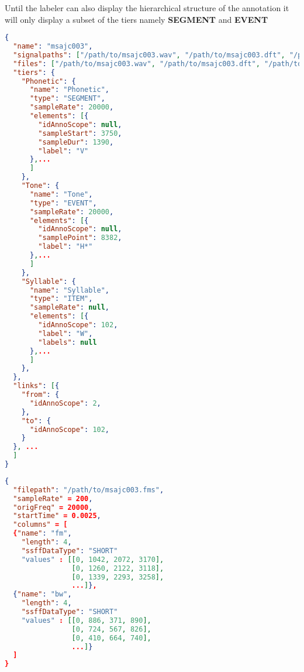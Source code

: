 \documentclass[A4,12pt, utf8]{article}
\begin{document}
Until the labeler can also display the hierarchical structure of the annotation it will only 
display a subset of the tiers namely \textbf{SEGMENT} and \textbf{EVENT}

\begin{lstlisting}[caption=New annotation file example, label=ilr, language=json,firstnumber=1]
{
  "name": "msajc003",
  "signalpaths": ["/path/to/msajc003.wav", "/path/to/msajc003.dft", "/path/2/msajc003.fms"],
  "files": ["/path/to/msajc003.wav", "/path/to/msajc003.dft", "/path/to/msajc003.fms"],
  "tiers": {
    "Phonetic": {
      "name": "Phonetic",
      "type": "SEGMENT",
      "sampleRate": 20000,
      "elements": [{
        "idAnnoScope": null,
        "sampleStart": 3750,
        "sampleDur": 1390,
        "label": "V"
      },...
      ]
    },
    "Tone": {
      "name": "Tone",
      "type": "EVENT",
      "sampleRate": 20000,
      "elements": [{
        "idAnnoScope": null,
        "samplePoint": 8382,
        "label": "H*"
      },...
      ]
    },
    "Syllable": {
      "name": "Syllable",
      "type": "ITEM",
      "sampleRate": null,
      "elements": [{
        "idAnnoScope": 102,
        "label": "W",
        "labels": null
      },...
      ]
    },
  },
  "links": [{
    "from": {
      "idAnnoScope": 2,
    },
    "to": {
      "idAnnoScope": 102,
    }
  }, ...
  ]
}
\end{lstlisting}

\begin{lstlisting}[caption=EMU-webApp internal derived signal representation, label=idsr, language=json,firstnumber=1]
{
  "filepath": "/path/to/msajc003.fms",
  "sampleRate" = 200,
  "origFreq" = 20000,
  "startTime" = 0.0025,
  "columns" = [
  {"name": "fm",
    "length": 4,
    "ssffDataType": "SHORT"
    "values" : [[0, 1042, 2072, 3170],
                [0, 1260, 2122, 3118],
                [0, 1339, 2293, 3258],
                ...]},
  {"name": "bw",
    "length": 4,
    "ssffDataType": "SHORT"
    "values" : [[0, 886, 371, 890],
                [0, 724, 567, 826],
                [0, 410, 664, 740],
                ...]}
  ]
}
\end{lstlisting}


\end{document}
